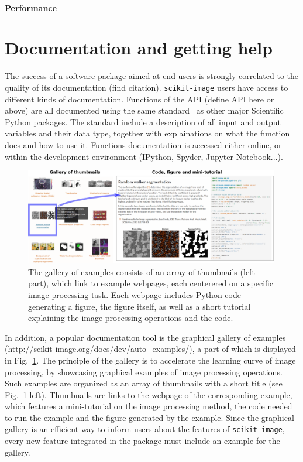 \documentclass[twocolumn]{bmcart}%
\begin{document}
\paragraph{Performance}

\section*{Documentation and getting help}

The success of a software package aimed at end-users is strongly
correlated to the quality of its documentation (find citation).
\texttt{scikit-image} users have access to different kinds of
documentation. Functions of the API (define API here or above) are all
documented using the same standard~\citep{Pawlik2015} as other major
Scientific Python packages. The standard include a description of all
input and output variables and their data type, together with
explainations on what the function does and how to use it. Functions
documentation is accessed either online, or within the development
environment (IPython, Spyder, Jupyter Notebook...). 

\begin{figure}
    \centerline{\includegraphics[width=0.99\textwidth]{figure_gallery}}
\caption{
 The gallery of examples consists of an array of thumbnails (left part), which link to example webpages, each centerered on a specific image processing task. Each webpage includes Python code generating a figure, the figure itself, as well as a short tutorial explaining the image processing operations and the code. \label{fig:gallery}}
\end{figure}

In addition, a popular documentation tool is the graphical gallery of
examples (\url{http://scikit-image.org/docs/dev/auto_examples/}), a part of which is displayed in Fig.~\ref{fig:gallery}.
The principle of the gallery is to accelerate the learning curve of image
processing, by showcasing graphical examples of image processing
operations. Such examples are organized as an array of thumbnails with a
short title (see Fig.~\ref{fig:gallery} left). Thumbnails are links to
the webpage of the corresponding example, which features a mini-tutorial
on the image processing method, the code needed to run the example and
the figure generated by the example. Since the graphical gallery is an
efficient way to inform users about the features of
\texttt{scikit-image}, every new feature integrated in the package must
include an example for the gallery.
\end{document}
